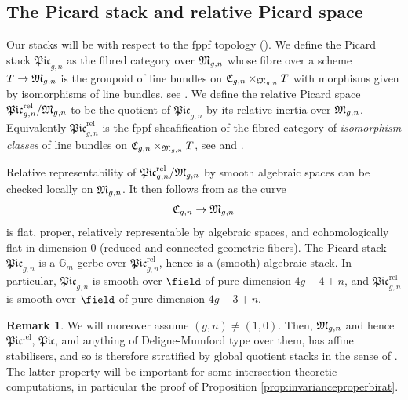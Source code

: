 \documentclass[a4paper,12pt]{article} %
\newcommand{\bb}[1]{{\mathbb{#1}}}
\theoremstyle{definition}
\newtheorem{remark}[definition]{Remark}
\theoremstyle{plain}%
\newcommand{\Picabs}{\mathfrak{Pic}}
\newcommand{\Picrel}{\mathfrak{Pic}^{\mathrm{rel}}}
\begin{document}
\subsection{The Picard stack and relative Picard space} \label{sec:pic_stacks}
Our stacks will be with respect to the fppf topology (\cite[Definition 9.1.1]{OlssonAlgebraic-spaces}). 
We define the Picard stack $\Picabs_{g,n}$ as the fibred category over $\frak M_{g,n}$ whose fibre over a scheme $T \to \frak M_{g,n}$ is the groupoid of line bundles on $\frak C_{g,n} \times_{\frak M_{g,n}} T$ with morphisms given by isomorphisms of line bundles, see \cite[14.4.7]{Laumon2000Champs-algebriq}. We define the relative Picard space $\Picrel_{g,n}/\frak M_{g,n}$ to be the quotient of $\Picabs_{g,n}$ by its relative inertia over $\frak M_{g,n}$. Equivalently $\Picrel_{g,n}$ is the fppf-sheafification of the fibred category of \emph{isomorphism classes} of line bundles on $\frak C_{g,n} \times_{\frak M_{g,n}} T$,
see \cite[Chapter 8]{Bosch1990Neron-models} and \cite[Chapter 9]{Fantechi2005Fundamental-alg}. 

Relative representability of $\Picrel_{g,n}/\frak M_{g, n}$ by smooth algebraic spaces can be checked locally on $\frak M_{g,n}$. It then follows from \cite[Appendix]{Artin1974Versal-deform} as the curve $$\frak C_{g,n} \to \frak M_{g,n}$$
is flat, proper, relatively representable by algebraic spaces, and cohomologically flat in dimension 0 (reduced and connected geometric fibers). The Picard stack $\Picabs_{g,n}$ is a $\bb G_m$-gerbe over $\Picrel_{g,n}$, hence is a (smooth) algebraic stack. In particular, $\Picabs_{g,n}$ is smooth over $\field$ of pure dimension $4g-4 + n$, and $\Picrel_{g,n}$ is smooth over $\field$ of pure dimension $4g - 3 + n$. 

\begin{remark} \label{Rmk:genus1n0}
We will moreover assume  $(g,n) \neq (1,0)$. Then, $\frak M_{g,n}$ and hence $\Picrel$, $\Picabs$, and anything of Deligne-Mumford type over them, has affine stabilisers, and so is therefore stratified by global quotient stacks in the sense of \cite{Kresch1999Cycle-groups-fo}. The latter property 
will be important for some intersection-theoretic computations, in particular the proof of Proposition \ref{prop:invarianceproperbirat}. 
\end{remark}
\end{document}
